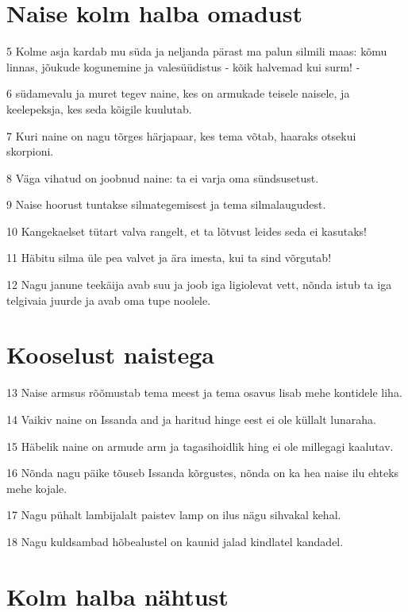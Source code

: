 \section*{Naise kolm halba omadust}

\par 5 Kolme asja kardab mu süda ja neljanda pärast ma palun silmili maas: kõmu linnas, jõukude kogunemine ja valesüüdistus - kõik halvemad kui surm! -
\par 6 südamevalu ja muret tegev naine, kes on armukade teisele naisele, ja keelepeksja, kes seda kõigile kuulutab.
\par 7 Kuri naine on nagu tõrges härjapaar, kes tema võtab, haaraks otsekui skorpioni.
\par 8 Väga vihatud on joobnud naine: ta ei varja oma sündsusetust.
\par 9 Naise hoorust tuntakse silmategemisest ja tema silmalaugudest.
\par 10 Kangekaelset tütart valva rangelt, et ta lõtvust leides seda ei kasutaks!
\par 11 Häbitu silma üle pea valvet ja ära imesta, kui ta sind võrgutab!
\par 12 Nagu janune teekäija avab suu ja joob iga ligiolevat vett, nõnda istub ta iga telgivaia juurde ja avab oma tupe noolele.

\section*{Kooselust naistega}

\par 13 Naise armsus rõõmustab tema meest ja tema osavus lisab mehe kontidele liha.
\par 14 Vaikiv naine on Issanda and ja haritud hinge eest ei ole küllalt lunaraha.
\par 15 Häbelik naine on armude arm ja tagasihoidlik hing ei ole millegagi kaalutav.
\par 16 Nõnda nagu päike tõuseb Issanda kõrgustes, nõnda on ka hea naise ilu ehteks mehe kojale.
\par 17 Nagu pühalt lambijalalt paistev lamp on ilus nägu sihvakal kehal.
\par 18 Nagu kuldsambad hõbealustel on kaunid jalad kindlatel kandadel.

\section*{Kolm halba nähtust}

